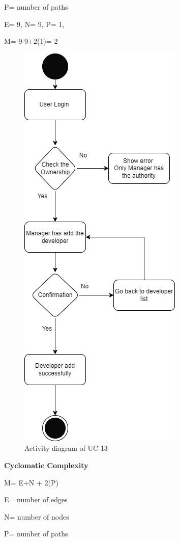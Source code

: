 P= number of paths

E= 9,
N= 9,
P= 1,

M= 9-9+2(1)= 2

\begin{figure}[H]
    \centering
    \includegraphics[scale=0.7]{./diagrams/Activity Diagram/ad-13.png}
    \caption{Activity diagram of UC-13}
    \label{fig:act-13}

\end{figure}


\textbf{Cyclomatic Complexity}

M= E+N + 2(P)

E= number of edges

N= number of nodes

P= number of paths

